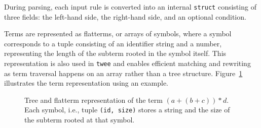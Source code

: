 During parsing, each input rule is converted into an internal \texttt{struct} consisting of three fields: the left-hand side, the right-hand side, and an optional condition.

Terms are represented as flatterms, or arrays of symbols, where a symbol corresponds to a tuple consisting of an identifier string and a number, representing the length of the subterm rooted in the symbol itself. This representation is also used in \texttt{twee} and enables efficient matching and rewriting as term traversal happens on an array rather than a tree structure. Figure~\ref{fig:flatterm-tree} illustrates the term representation using an example.

\begin{figure}[h]
	\centering
	\caption{Tree and flatterm representation of the term $(a + (b + c)) * d$. Each symbol, i.e., tuple \texttt{(id, size)} stores a string and the size of the subterm rooted at that symbol.}
	\label{fig:flatterm-tree}
\end{figure}

